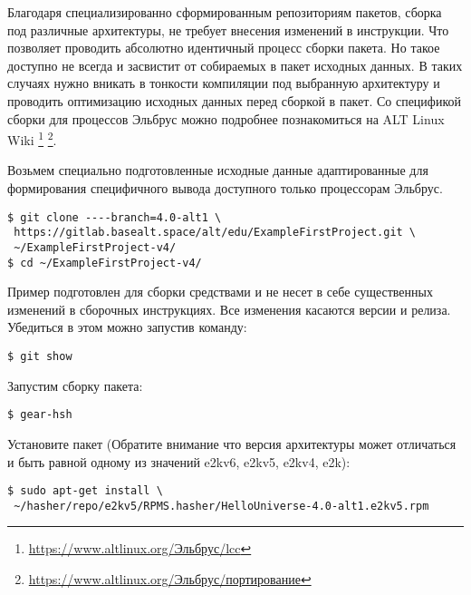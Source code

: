 
Благодаря специализированно сформированным репозиториям пакетов, сборка
под различные архитектуры, не требует внесения изменений в инструкции.
Что позволяет проводить абсолютно идентичный процесс сборки пакета.
Но такое доступно не всегда и засвистит от собираемых в пакет исходных данных.
В таких случаях нужно вникать в тонкости компиляции под выбранную архитектуру
и проводить оптимизацию исходных данных перед сборкой в пакет.
Со спецификой сборки для процессов Эльбрус можно подробнее познакомиться
на ALT Linux Wiki%
\footnote{\href{https://www.altlinux.org/\%D0\%AD\%D0\%BB\%D1\%8C\%D0\%B1\%D1\%80\%D1\%83\%D1\%81/lcc}{https://www.altlinux.org/Эльбрус/lcc}}%
\footnote{\href{https://www.altlinux.org/\%D0\%AD\%D0\%BB\%D1\%8C\%D0\%B1\%D1\%80\%D1\%83\%D1\%81/\%D0\%BF\%D0\%BE\%D1\%80\%D1\%82\%D0\%B8\%D1\%80\%D0\%BE\%D0\%B2\%D0\%B0\%D0\%BD\%D0\%B8\%D0\%B5}{https://www.altlinux.org/Эльбрус/портирование}}.

Возьмем специально подготовленные исходные данные адаптированные для
формирования специфичного вывода доступного только процессорам Эльбрус.

\begin{verbatim}
$ git clone ----branch=4.0-alt1 \
 https://gitlab.basealt.space/alt/edu/ExampleFirstProject.git \
 ~/ExampleFirstProject-v4/
$ cd ~/ExampleFirstProject-v4/
\end{verbatim}

Пример подготовлен для сборки средствами  и не несет в себе существенных
изменений в сборочных инструкциях. Все изменения касаются версии и релиза.
Убедиться в этом можно запустив команду:
\begin{verbatim}
$ git show
\end{verbatim}

Запустим сборку пакета:
\begin{verbatim}
$ gear-hsh
\end{verbatim}

Установите пакет (Обратите внимание что версия архитектуры может отличаться и быть равной одному из значений e2kv6, e2kv5, e2kv4, e2k):
\begin{verbatim}
$ sudo apt-get install \
 ~/hasher/repo/e2kv5/RPMS.hasher/HelloUniverse-4.0-alt1.e2kv5.rpm
\end{verbatim}

